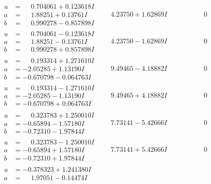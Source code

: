 \documentclass[1p]{elsarticle_modified}
\theoremstyle{definition}
\begin{document}
$$\begin{array}{c|c|c}
 \hline 
\begin{aligned}
u &= \phantom{-}0.704061 + 0.123618 I \\
a &= \phantom{-}1.88251 + 0.13761 I \\
b &= \phantom{-}0.990278 - 0.857898 I\end{aligned}
 & \phantom{-}4.23750 + 1.62869 I & \phantom{-0.000000 } 0 \\ \hline\begin{aligned}
u &= \phantom{-}0.704061 - 0.123618 I \\
a &= \phantom{-}1.88251 - 0.13761 I \\
b &= \phantom{-}0.990278 + 0.857898 I\end{aligned}
 & \phantom{-}4.23750 - 1.62869 I & \phantom{-0.000000 } 0 \\ \hline\begin{aligned}
u &= \phantom{-}0.193314 + 1.271610 I \\
a &= -2.05285 + 1.13190 I \\
b &= -0.670798 - 0.064763 I\end{aligned}
 & \phantom{-}9.49465 - 4.18882 I & \phantom{-0.000000 } 0 \\ \hline\begin{aligned}
u &= \phantom{-}0.193314 - 1.271610 I \\
a &= -2.05285 - 1.13190 I \\
b &= -0.670798 + 0.064763 I\end{aligned}
 & \phantom{-}9.49465 + 4.18882 I & \phantom{-0.000000 } 0 \\ \hline\begin{aligned}
u &= \phantom{-}0.323783 + 1.250010 I \\
a &= -0.65894 - 1.57180 I \\
b &= -0.72310 - 1.97844 I\end{aligned}
 & \phantom{-}7.73141 - 5.42666 I & \phantom{-0.000000 } 0 \\ \hline\begin{aligned}
u &= \phantom{-}0.323783 - 1.250010 I \\
a &= -0.65894 + 1.57180 I \\
b &= -0.72310 + 1.97844 I\end{aligned}
 & \phantom{-}7.73141 + 5.42666 I & \phantom{-0.000000 } 0 \\ \hline\begin{aligned}
u &= -0.378323 + 1.241380 I \\
a &= \phantom{-}1.97051 - 0.14474 I \\

\end{aligned}
\end{array}$$
\end{document}
